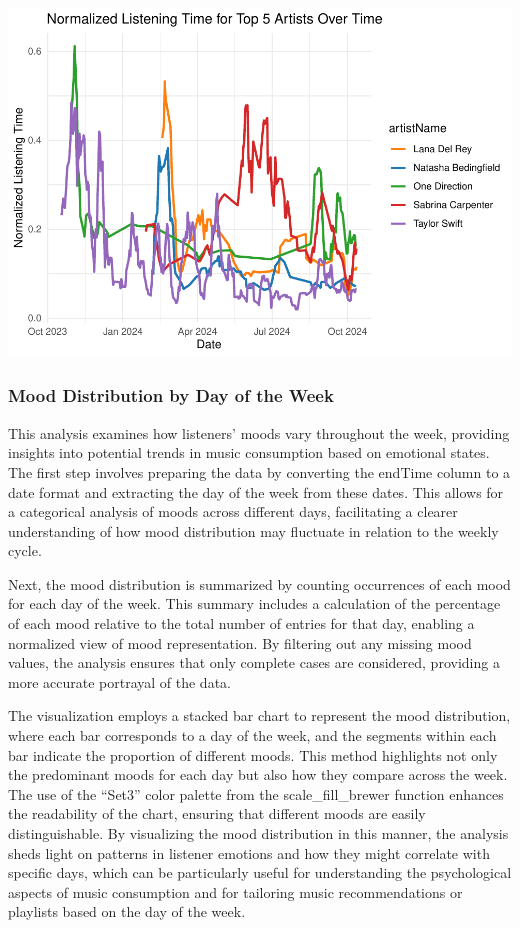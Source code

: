 \documentclass[
]{article}
\begin{document}
\includegraphics{SpotifyProjectPDF_files/figure-latex/unnamed-chunk-15-1.pdf}

\subsubsection{Mood Distribution by Day of the
Week}\label{mood-distribution-by-day-of-the-week}

This analysis examines how listeners' moods vary throughout the week,
providing insights into potential trends in music consumption based on
emotional states. The first step involves preparing the data by
converting the endTime column to a date format and extracting the day of
the week from these dates. This allows for a categorical analysis of
moods across different days, facilitating a clearer understanding of how
mood distribution may fluctuate in relation to the weekly cycle.

Next, the mood distribution is summarized by counting occurrences of
each mood for each day of the week. This summary includes a calculation
of the percentage of each mood relative to the total number of entries
for that day, enabling a normalized view of mood representation. By
filtering out any missing mood values, the analysis ensures that only
complete cases are considered, providing a more accurate portrayal of
the data.

The visualization employs a stacked bar chart to represent the mood
distribution, where each bar corresponds to a day of the week, and the
segments within each bar indicate the proportion of different moods.
This method highlights not only the predominant moods for each day but
also how they compare across the week. The use of the ``Set3'' color
palette from the scale\_fill\_brewer function enhances the readability
of the chart, ensuring that different moods are easily distinguishable.
By visualizing the mood distribution in this manner, the analysis sheds
light on patterns in listener emotions and how they might correlate with
specific days, which can be particularly useful for understanding the
psychological aspects of music consumption and for tailoring music
recommendations or playlists based on the day of the week.
\end{document}
